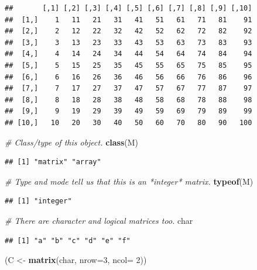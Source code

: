 \documentclass[
]{book}
\newenvironment{Shaded}{\begin{snugshade}}{\end{snugshade}}
\newcommand{\AttributeTok}[1]{\textcolor[rgb]{0.13,0.29,0.53}{#1}}
\newcommand{\CommentTok}[1]{\textcolor[rgb]{0.56,0.35,0.01}{\textit{#1}}}
\newcommand{\DecValTok}[1]{\textcolor[rgb]{0.00,0.00,0.81}{#1}}
\newcommand{\FunctionTok}[1]{\textcolor[rgb]{0.13,0.29,0.53}{\textbf{#1}}}
\newcommand{\NormalTok}[1]{#1}
\newcommand{\OtherTok}[1]{\textcolor[rgb]{0.56,0.35,0.01}{#1}}
\begin{document}
\begin{verbatim}
##       [,1] [,2] [,3] [,4] [,5] [,6] [,7] [,8] [,9] [,10]
##  [1,]    1   11   21   31   41   51   61   71   81    91
##  [2,]    2   12   22   32   42   52   62   72   82    92
##  [3,]    3   13   23   33   43   53   63   73   83    93
##  [4,]    4   14   24   34   44   54   64   74   84    94
##  [5,]    5   15   25   35   45   55   65   75   85    95
##  [6,]    6   16   26   36   46   56   66   76   86    96
##  [7,]    7   17   27   37   47   57   67   77   87    97
##  [8,]    8   18   28   38   48   58   68   78   88    98
##  [9,]    9   19   29   39   49   59   69   79   89    99
## [10,]   10   20   30   40   50   60   70   80   90   100
\end{verbatim}

\begin{Shaded}
\begin{Highlighting}[]
\CommentTok{\# Class/type of this object.}
\FunctionTok{class}\NormalTok{(M)}
\end{Highlighting}
\end{Shaded}

\begin{verbatim}
## [1] "matrix" "array"
\end{verbatim}

\begin{Shaded}
\begin{Highlighting}[]
\CommentTok{\# Type and mode tell us that this is an *integer* matrix.}
\FunctionTok{typeof}\NormalTok{(M)}
\end{Highlighting}
\end{Shaded}

\begin{verbatim}
## [1] "integer"
\end{verbatim}

\begin{Shaded}
\begin{Highlighting}[]
\CommentTok{\# There are character and logical matrices too.}
\NormalTok{char}
\end{Highlighting}
\end{Shaded}

\begin{verbatim}
## [1] "a" "b" "c" "d" "e" "f"
\end{verbatim}

\begin{Shaded}
\begin{Highlighting}[]
\NormalTok{(C }\OtherTok{\textless{}{-}} \FunctionTok{matrix}\NormalTok{(char, }\AttributeTok{nrow=}\DecValTok{3}\NormalTok{, }\AttributeTok{ncol=} \DecValTok{2}\NormalTok{))}
\end{Highlighting}
\end{Shaded}
\end{document}
